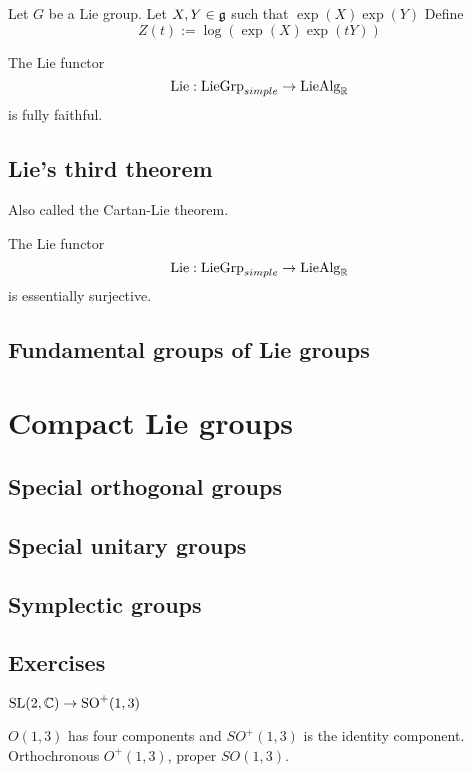 \documentclass{../../large}
\begin{document}
\begin{prb}
Let $G$ be a Lie group.
Let $X,Y\in\mathfrak{g}$ such that $\exp(X)\exp(Y)$
Define
\[Z(t):=\log(\exp(X)\exp(tY))\]
\end{prb}

\begin{prb}[]
\begin{parts}
\item The Lie functor
\[\mathrm{Lie}:\mathrm{LieGrp}_{simple}\to\mathrm{LieAlg}_{\mathbb{R}}\]
is fully faithful.
\end{parts}
\end{prb}


\section{Lie's third theorem}
\begin{prb}
\end{prb}

\begin{prb}
Also called the Cartan-Lie theorem.
\begin{parts}
\item The Lie functor
\[\mathrm{Lie}:\mathrm{LieGrp}_{simple}\to\mathrm{LieAlg}_{\mathbb{R}}\]
is essentially surjective.
\end{parts}
\end{prb}

\section{Fundamental groups of Lie groups}



\chapter{Compact Lie groups}
\section{Special orthogonal groups}
\section{Special unitary groups}
\section{Symplectic groups}

\section*{Exercises}
\begin{prb}
$\mathrm{SL}(2,\mathbb{C})\to\mathrm{SO}^+(1,3)$
\begin{parts}
\item $O(1,3)$ has four components and $SO^+(1,3)$ is the identity component. Orthochronous $O^+(1,3)$, proper $SO(1,3)$.
\end{parts}
\end{prb}
\end{document}
